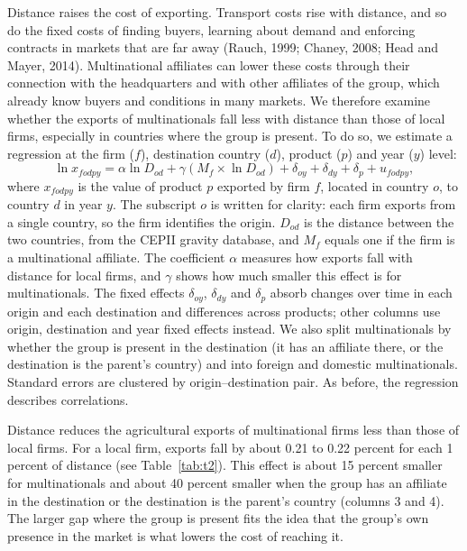 \documentclass[11pt,a4paper]{article}
\begin{document}
Distance raises the cost of exporting. Transport costs rise with distance, and so do the fixed costs
of finding buyers, learning about demand and enforcing contracts in markets that are far away
(Rauch, 1999; Chaney, 2008; Head and Mayer, 2014). Multinational affiliates can lower these costs
through their connection with the headquarters and with other affiliates of the group, which
already know buyers and conditions in many markets. We therefore examine whether the exports of
multinationals fall less with distance than those of local firms, especially in countries where
the group is present. To do so, we estimate a regression at the firm ($f$), destination
country ($d$), product ($p$) and year ($y$) level:
\begin{equation}\label{eq:dist}
\ln x_{fodpy} = \alpha \ln D_{od} + \gamma \left(M_{f} \times \ln D_{od}\right) + \delta_{oy} + \delta_{dy} + \delta_{p} + u_{fodpy},
\end{equation}
where $x_{fodpy}$ is the value of product $p$ exported by firm $f$, located in country $o$, to
country $d$ in year $y$. The subscript $o$ is written for clarity: each firm exports from a single
country, so the firm identifies the origin. $D_{od}$ is the distance between the two countries, from
the CEPII gravity database, and $M_f$ equals one if the firm is a multinational affiliate. The
coefficient $\alpha$ measures how exports fall with distance for local firms, and $\gamma$ shows
how much smaller this effect is for multinationals. The fixed effects $\delta_{oy}$, $\delta_{dy}$
and $\delta_p$ absorb changes over time in each origin and each destination and differences across
products; other columns use origin, destination and year fixed effects instead. We also split
multinationals by whether the group is present in the destination (it has an affiliate there, or
the destination is the parent's country) and into foreign and domestic multinationals. Standard
errors are clustered by origin--destination pair. As before, the regression describes correlations.

Distance reduces the agricultural exports of multinational firms less than those of local firms.
For a local firm, exports fall by about 0.21 to 0.22 percent for each 1 percent of distance (see
Table~\ref{tab:t2}). This effect is about 15 percent smaller for multinationals and about 40
percent smaller when the group has an affiliate in the destination or the destination is the
parent's country (columns 3 and 4). The larger gap where the group is present fits the idea that
the group's own presence in the market is what lowers the cost of reaching it.
\end{document}

